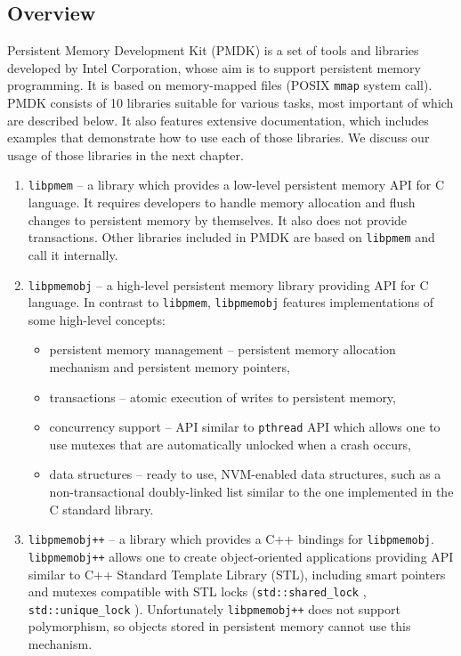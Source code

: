     \subsection{Overview}
        Persistent Memory Development Kit (PMDK) \cite{PmemIo} is a set of tools and libraries developed by Intel Corporation, whose aim is to support persistent memory programming. It is based on memory-mapped files (POSIX \texttt{mmap} system call). PMDK consists of 10 libraries suitable for various tasks, most important of which are described below. It also features extensive documentation, which includes examples that demonstrate how to use each of those libraries. We discuss our usage of those libraries in the next chapter.
        
    \begin{enumerate}
    
    \item
        \texttt{libpmem} -- a library which provides a low-level persistent memory API for C language. It requires developers to handle memory allocation and flush changes to persistent memory by themselves. It also does not provide transactions. Other libraries included in PMDK are based on \texttt{libpmem} and call it internally.
    
    \item
        \texttt{libpmemobj} -- a high-level persistent memory library providing API for C language. In contrast to \texttt{libpmem}, \texttt{libpmemobj} features implementations of some high-level concepts: 
        \begin{itemize}
            \item persistent memory management -- persistent memory allocation mechanism and persistent memory pointers,
            \item transactions -- atomic execution of writes to persistent memory,
            \item concurrency support -- API similar to \texttt{pthread} API which allows one to use mutexes that are automatically unlocked when a crash occurs,
            \item data structures -- ready to use, NVM-enabled data structures, such as a non-transactional doubly-linked list similar to the one implemented in the C standard library. 
        \end{itemize}
        
    \item
        \texttt{libpmemobj++} -- a library which provides a C++ bindings for \texttt{libpmemobj}. \texttt{libpmem\-obj++} allows one to create object-oriented applications providing API similar to C++ Standard Template Library (STL), including smart pointers and mutexes compatible with STL locks (\texttt{std::shared\_lock} \cite{SharedLock}, \texttt{std::unique\_lock} \cite{UniqueLock}).
        Unfortunately \texttt{libpmemobj++} does not support polymorphism, so objects stored in persistent memory cannot use this mechanism.
    \end{enumerate}
    
